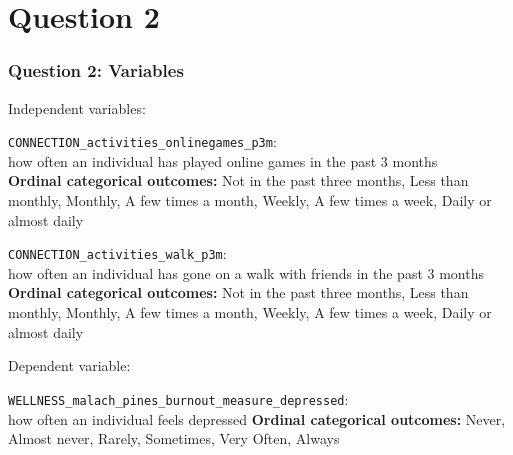 \documentclass{beamer}
\begin{document}

\section{Question 2}

\begin{frame}
    \frametitle{Question 2: Variables}
    
    Independent variables:
    
    \vspace{1em}
    
    {\small{\tt CONNECTION\_activities\_onlinegames\_p3m}:\\
    how often an individual has played online games in the past 3 months}\\
    {\tiny \textbf{Ordinal categorical outcomes:} Not in the past three months, Less than monthly, Monthly, A few times a month, Weekly, A few times a week, Daily or almost daily}

    
    \vspace{0.5em}
    
    {\small{\tt CONNECTION\_activities\_walk\_p3m}:\\
    how often an individual has gone on a walk with friends in the past 3 months}\\
    {\tiny \textbf{Ordinal categorical outcomes:} Not in the past three months, Less than monthly, Monthly, A few times a month, Weekly, A few times a week, Daily or almost daily}
    
    \vspace{1.5em}
    
    Dependent variable:

    \vspace{1em}
    
    {\small{\tt WELLNESS\_malach\_pines\_burnout\_measure\_depressed}:\\
    how often an individual feels depressed}
    {\tiny \textbf{Ordinal categorical outcomes:} Never, Almost never, Rarely, Sometimes, Very Often, Always}
    
    
\end{frame}
\end{document}
